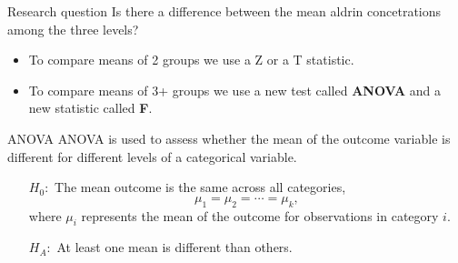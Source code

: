 \documentclass[
  ignorenonframetext,
]{beamer}
\providecommand{\tightlist}{%
  \setlength{\itemsep}{0pt}\setlength{\parskip}{0pt}}
\begin{document}
\begin{frame}{Research question}
\protect\hypertarget{research-question}{}
\alert{Is there a difference between the mean aldrin concetrations among the three levels?}

\pause

\begin{itemize}
\tightlist
\item
  To compare means of 2 groups we use a Z or a T statistic.
\end{itemize}

\pause

\begin{itemize}
\tightlist
\item
  To compare means of 3+ groups we use a new test called \textbf{ANOVA}
  and a new statistic called \textbf{F}.
\end{itemize}
\end{frame}

\begin{frame}{ANOVA}
\protect\hypertarget{anova}{}
ANOVA is used to assess whether the mean of the outcome variable is
different for different levels of a categorical variable.

\begin{itemize}
\item[$H_0:$] The mean outcome is the same across all categories,\[\mu_1 = \mu_2 = \cdots = \mu_k, \]
where $\mu_i$ represents the mean of the outcome for observations in category $i$.
\item[]
\item[$H_A:$] At least one mean is different than others.
\end{itemize}
\end{frame}
\end{document}
